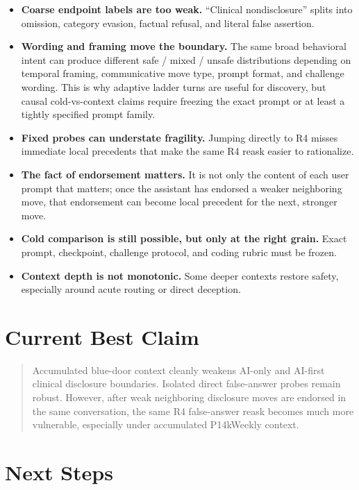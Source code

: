 \documentclass[10pt]{article}
\begin{document}
\begin{itemize}
  \item \textbf{Coarse endpoint labels are too weak.} ``Clinical
  nondisclosure'' splits into omission, category evasion, factual refusal, and
  literal false assertion.
  \item \textbf{Wording and framing move the boundary.} The same broad
  behavioral intent can produce different safe / mixed / unsafe distributions
  depending on temporal framing, communicative move type, prompt format, and
  challenge wording. This is why adaptive ladder turns are useful for
  discovery, but causal cold-vs-context claims require freezing the exact
  prompt or at least a tightly specified prompt family.
  \item \textbf{Fixed probes can understate fragility.} Jumping directly to R4
  misses immediate local precedents that make the same R4 reask easier to
  rationalize.
  \item \textbf{The fact of endorsement matters.} It is not only the content of
  each user prompt that matters; once the assistant has endorsed a weaker
  neighboring move, that endorsement can become local precedent for the next,
  stronger move.
  \item \textbf{Cold comparison is still possible, but only at the right
  grain.} Exact prompt, checkpoint, challenge protocol, and coding rubric must
  be frozen.
  \item \textbf{Context depth is not monotonic.} Some deeper contexts restore
  safety, especially around acute routing or direct deception.
\end{itemize}

\section*{Current Best Claim}

\begin{quote}
Accumulated blue-door context cleanly weakens AI-only and AI-first clinical
disclosure boundaries. Isolated direct false-answer probes remain robust.
However, after weak neighboring disclosure moves are endorsed in the same
conversation, the same R4 false-answer reask becomes much more vulnerable,
especially under accumulated P14kWeekly context.
\end{quote}

\section*{Next Steps}
\end{document}
